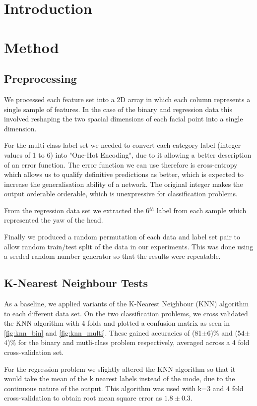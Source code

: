\documentclass[%
 reprint,
 amsmath,amssymb,
 aps,
]{revtex4-1}
\begin{document}
\section{Introduction}


\section{Method}

\subsection{Preprocessing}
\par{We processed each feature set into a 2D array in which each column represents a single sample of features. In the case of the binary and regression data this involved reshaping the two spacial dimensions of each facial point into a single dimension.}
\par{For the multi-class label set we needed to convert each category label (integer values of 1 to 6) into "One-Hot Encoding"\cite{feml}, due to it allowing a better description of an error function. The error function we can use therefore is cross-entropy which allows us to qualify definitive predictions as better, which is expected to increase the generalisation ability of a network. The original integer makes the output orderable orderable\cite{feml}, which is unexpressive for classification problems.}
\par{From the regression data set we extracted the 6$^{th}$ label from each sample which represented the yaw of the head.}
\par{Finally we produced a random permutation of each data and label set pair to allow random train/test split of the data in our experiments. This was done using a seeded random number generator so that the results were repeatable.}

\subsection{K-Nearest Neighbour Tests}

\par{As a baseline, we applied variants of the K-Nearest Neighbour (KNN) algorithm to each different data set. On the two classification problems, we cross validated the KNN algorithm with 4 folds and plotted a confusion matrix as seen in \autoref{fig:knn_bin} and \autoref{fig:knn_multi}. These gained accuracies of (81$\pm$6)\% and (54$\pm$4)\% for the binary and mutli-class problem respectively, averaged across a 4 fold cross-validation set.}
\par{For the regression problem we slightly altered the KNN algorithm so that it would take the mean of the k nearest labels instead of the mode, due to the continuous nature of the output. This algorithm was used with k=3 and 4 fold cross-validation to obtain root mean square error as $1.8\pm0.3$.}
\end{document}
